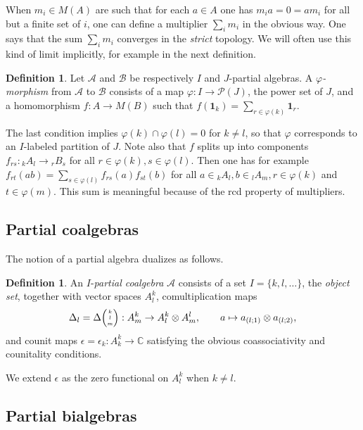 \documentclass[10pt]{article}
\newcommand{\C}{\mathbb{C}}
\newcommand{\GrDA}[3]{{}_{#2}#1_{#3}} %
\newcommand{\Grtt}[4]{#1{\tiny {\begin{pmatrix} #2\\#3\\#4\end{pmatrix}}}}
\newcommand{\GrRA}[3]{#1^{#2}_{#3}} %
\newcommand{\Unit}{\mathbf{1}}
\theoremstyle{definition}
\newtheorem{Def}[Theorem]{Definition}
\numberwithin{equation}{section}
\begin{document}
When $m_i\in M(A)$ are such that for each $a\in A$ one has $m_ia =0=am_i$ for all but a finite set of $i$, one can define a multiplier $\sum_i m_i$ in the obvious way. One says that the sum $\sum_i m_i$ converges in the \emph{strict} topology. We will often use this kind of limit implicitly, for example in the next definition.
 
\begin{Def}\label{DefMor} Let $\mathscr{A}$ and $\mathscr{B}$ be respectively $I$ and $J$-partial algebras. A \emph{$\varphi$-morphism} from $\mathscr{A}$ to $\mathscr{B}$ consists of a map $\varphi:I \rightarrow \mathscr{P}(J)$, the power set of $J$, and a homomorphism $f:A\rightarrow M(B)$ such that $f(\Unit_k) = \sum_{r\in \varphi(k)} \Unit_r$.
\end{Def} 
The last condition implies $\varphi(k)\cap \varphi(l)=0$ for
$k\neq l$, so that $\varphi$ corresponds to an $I$-labeled partition of $J$.
Note also that  $f$ splits up into components $f_{rs}:
\GrDA{A}{k}{l}\rightarrow \GrDA{B}{r}{s}$ for all $r\in \varphi(k),s\in
\varphi(l)$. Then one has for example $f_{rt}(ab) = \sum_{s\in \varphi(l)}
f_{rs}(a)f_{st}(b)$ for all $a\in \GrDA{A}{k}{l}, b\in \GrDA{A}{l}{m},
r\in \varphi(k)$ and $t\in \varphi(m)$. This sum is meaningful
because of the rcd property of multipliers.  
 

\subsection{Partial coalgebras}

The notion of a partial algebra dualizes as follows.

\begin{Def}\label{DefCoAlg} An  $I$-\emph{partial coalgebra} $\mathscr{A}$ consists of a set $I=\{k,l,\ldots\}$, the \emph{object set}, together with vector spaces $\GrRA{A}{k}{l}$, comultiplication maps \[\Delta_{l} = \Grtt{\Delta}{k}{l}{m}:\GrRA{A}{k}{m}\rightarrow \GrRA{A}{k}{l}\otimes \GrRA{A}{l}{m},\qquad a \mapsto a_{(l;1)}\otimes a_{(l;2)},\] and counit maps $\epsilon =\epsilon_k:\GrRA{A}{k}{k}\rightarrow \C$ satisfying the obvious coassociativity and counitality conditions.
\end{Def}

We extend $\epsilon$ as the zero functional on $\GrRA{A}{k}{l}$ when $k\neq l$.

\subsection{Partial bialgebras}
\end{document}
